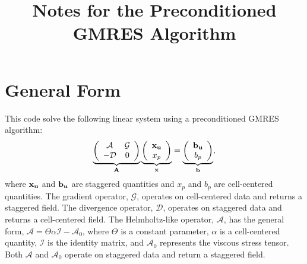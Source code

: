 \documentclass[final]{siamltex}
\def\Ab {{\bf A}}
\def\bb {{\bf b}}
\def\ub {{\bf u}}
\def\xb {{\bf x}}
\begin{document}
\title{Notes for the Preconditioned GMRES Algorithm}

\maketitle

\section{General Form}
This code solve the following linear system using a preconditioned GMRES algorithm:
\begin{equation}
\underbrace{
\left(\begin{array}{cc}
\mathcal{A} & \mathcal{G} \\
-\mathcal{D} & 0
\end{array}\right)
}_{\Ab}
\underbrace{
\left(\begin{array}{c}
\xb_{\ub} \\
x_p
\end{array}\right)
}_{\xb}
=
\underbrace{
\left(\begin{array}{c}
\bb_{\ub}\\
b_p
\end{array}\right)}_{\bb},\label{eq:Ax=b}
\end{equation}
where $\xb_\ub$ and $\bb_\ub$ are staggered quantities and $x_p$ and $b_p$ are
cell-centered quantities.  The gradient operator, $\mathcal{G}$, operates on
cell-centered data and returns a staggered field.  The divergence operator, 
$\mathcal{D}$, operates on staggered data and returns a cell-centered field.  
The Helmholtz-like operator, $\mathcal{A}$, has the general form,
$\mathcal{A} = \Theta\alpha\mathcal{I} - \mathcal{A}_0$, where
$\Theta$ is a constant parameter,
$\alpha$ is a cell-centered quantity,
$\mathcal{I}$ is the identity matrix, 
and $\mathcal{A}_0$ represents the viscous stress tensor.
Both $\mathcal{A}$ and $\mathcal{A}_0$ operate on staggered data and return
a staggered field.\\
\end{document}
